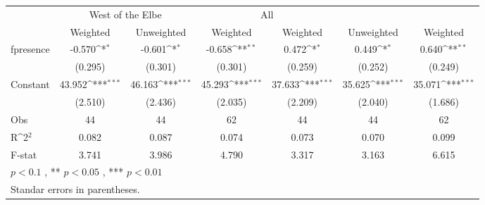 {
\def\sym#1{\ifmmode^{#1}\else\(^{#1}\)\fi}
\begin{tabular}{@{\extracolsep{2pt}}l*{6}{c}@{}}
\hline\hline
& \multicolumn{2}{c}{West of the Elbe} & \multicolumn{2}{c}{All} \\
\cline{2-3-4}
\cline{5-6}
 & Weighted & Unweighted & Weighted & Weighted & Unweighted & Weighted \\
\hline
fpresence & -0.570\sym{*} & -0.601\sym{*} & -0.658\sym{**} & 0.472\sym{*} & 0.449\sym{*} & 0.640\sym{**} \\
 & (0.295) & (0.301) & (0.301) & (0.259) & (0.252) & (0.249) \\
Constant & 43.952\sym{***} & 46.163\sym{***} & 45.293\sym{***} & 37.633\sym{***} & 35.625\sym{***} & 35.071\sym{***} \\
 & (2.510) & (2.436) & (2.035) & (2.209) & (2.040) & (1.686) \\

\hline
Obs & 44 & 44 & 62 & 44 & 44 & 62 \\
R\sym{2} & 0.082 & 0.087 & 0.074 & 0.073 & 0.070 & 0.099 \\
F-stat & 3.741 & 3.986 & 4.790 & 3.317 & 3.163 & 6.615 \\
\hline\hline
\multicolumn{7}{l}{\footnotesize *$p < 0.1$ , ** $p < 0.05$ , *** $p < 0.01$} \\
\multicolumn{7}{l}{\footnotesize Standar errors in parentheses.} \\
\end{tabular}
}